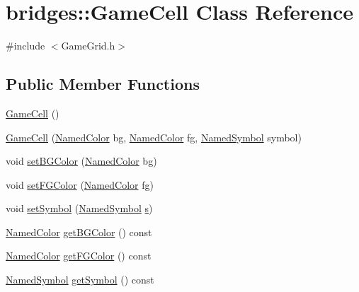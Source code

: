 \hypertarget{classbridges_1_1_game_cell}{}\section{bridges\+:\+:Game\+Cell Class Reference}
\label{classbridges_1_1_game_cell}


{\ttfamily \#include $<$Game\+Grid.\+h$>$}

\subsection*{Public Member Functions}
\begin{DoxyCompactItemize}
\item 
\hyperlink{classbridges_1_1_game_cell_ad498aad8d6cb4d3e956f19071a8ae201}{Game\+Cell} ()
\item 
\hyperlink{classbridges_1_1_game_cell_a5c6b1800cd495ef394112eecaf76eb16}{Game\+Cell} (\hyperlink{namespacebridges_ad811207d8898a7fd6b72a74725e68357}{Named\+Color} bg, \hyperlink{namespacebridges_ad811207d8898a7fd6b72a74725e68357}{Named\+Color} fg, \hyperlink{namespacebridges_acfb0a4f7877d8f63de3e6862004c50ed}{Named\+Symbol} symbol)
\item 
void \hyperlink{classbridges_1_1_game_cell_a9fcc58283b9f6fb770f27ae30233afe6}{set\+B\+G\+Color} (\hyperlink{namespacebridges_ad811207d8898a7fd6b72a74725e68357}{Named\+Color} bg)
\item 
void \hyperlink{classbridges_1_1_game_cell_a6e67986a1e6d64a33da9109ed7245a3b}{set\+F\+G\+Color} (\hyperlink{namespacebridges_ad811207d8898a7fd6b72a74725e68357}{Named\+Color} fg)
\item 
void \hyperlink{classbridges_1_1_game_cell_a3a10764d65796da2727b7f99324b229e}{set\+Symbol} (\hyperlink{namespacebridges_acfb0a4f7877d8f63de3e6862004c50ed}{Named\+Symbol} \hyperlink{namespacebridges_acfb0a4f7877d8f63de3e6862004c50eda03c7c0ace395d80182db07ae2c30f034}{s})
\item 
\hyperlink{namespacebridges_ad811207d8898a7fd6b72a74725e68357}{Named\+Color} \hyperlink{classbridges_1_1_game_cell_a781afb078bedaba909f124eddd543056}{get\+B\+G\+Color} () const
\item 
\hyperlink{namespacebridges_ad811207d8898a7fd6b72a74725e68357}{Named\+Color} \hyperlink{classbridges_1_1_game_cell_af33d2a831608968e4c2dd53692aafac8}{get\+F\+G\+Color} () const
\item 
\hyperlink{namespacebridges_acfb0a4f7877d8f63de3e6862004c50ed}{Named\+Symbol} \hyperlink{classbridges_1_1_game_cell_af6bb157599096b8149a69b227414becb}{get\+Symbol} () const
\end{DoxyCompactItemize}


